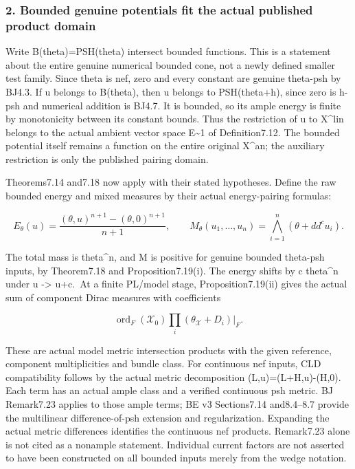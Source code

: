 \documentclass[
]{article}
\begin{document}
\subsubsection{2. Bounded genuine potentials fit the actual published
product
domain}\label{bounded-genuine-potentials-fit-the-actual-published-product-domain}

Write B(theta)=PSH(theta) intersect bounded functions. This is a
statement about the entire genuine numerical bounded cone, not a newly
defined smaller test family. Since theta is nef, zero and every constant
are genuine theta-psh by BJ4.3. If u belongs to B(theta), then u belongs
to PSH(theta+h), since zero is h-psh and numerical addition is BJ4.7. It
is bounded, so its ample energy is finite by monotonicity between its
constant bounds. Thus the restriction of u to X\^{}lin belongs to the
actual ambient vector space E\textasciitilde1 of Definition7.12. The
bounded potential itself remains a function on the entire original
X\^{}an; the auxiliary restriction is only the published pairing domain.

Theorems7.14 and7.18 now apply with their stated hypotheses. Define the
raw bounded energy and mixed measures by their actual energy-pairing
formulas:

\[E_\theta(u)=\frac{(\theta,u)^{n+1}-(\theta,0)^{n+1}}{n+1},\qquad
M_\theta(u_1,\ldots,u_n)=\bigwedge_{i=1}^n(\theta+dd^cu_i).\]

The total mass is theta\^{}n, and M is positive for genuine bounded
theta-psh inputs, by Theorem7.18 and Proposition7.19(i). The energy
shifts by c theta\^{}n under u -\textgreater{} u+c.~At a finite PL/model
stage, Proposition7.19(ii) gives the actual sum of component Dirac
measures with coefficients

\[\operatorname{ord}_F(\mathcal X_0)\prod_i(\theta_{\mathcal X}+D_i)|_F.\]

These are actual model metric intersection products with the given
reference, component multiplicities and bundle class. For continuous nef
inputs, CLD compatibility follows by the actual metric decomposition
(L,u)=(L+H,u)-(H,0). Each term has an actual ample class and a verified
continuous psh metric. BJ Remark7.23 applies to those ample terms; BE v3
Sections7.14 and8.4--8.7 provide the multilinear difference-of-psh
extension and regularization. Expanding the actual metric differences
identifies the continuous nef products. Remark7.23 alone is not cited as
a nonample statement. Individual current factors are not asserted to
have been constructed on all bounded inputs merely from the wedge
notation.
\end{document}

